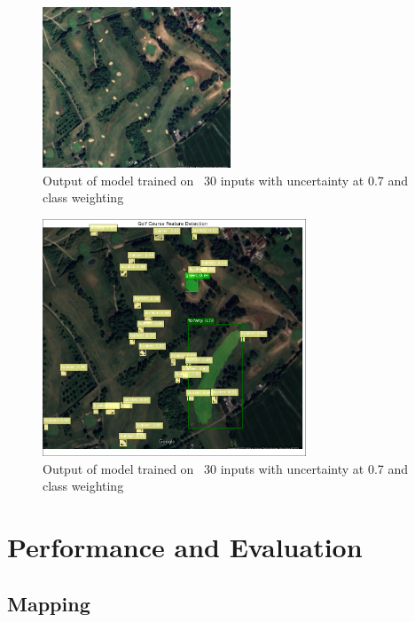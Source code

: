 \documentclass[final]{cmpreport_02}
\begin{document}
\begin{figure}[h!]
	\centering
	\includegraphics[width=0.5\textwidth]{./images/AEEnglishCoursePlain.png}
	\caption{Output of model trained on ~30 inputs with uncertainty at 0.7 and class weighting}
	\label{am:AEEnglishCoursePlain}
\end{figure}


\begin{figure}[h!]
	\centering
	\includegraphics[width=0.7\textwidth]{./images/AEEnglishCourseResult.png}
	\caption{Output of model trained on ~30 inputs with uncertainty at 0.7 and class weighting}
	\label{am:AEEnglishCourseResult}
\end{figure}



\clearpage
\section{Performance and Evaluation}
\subsection{Mapping}
\end{document}
